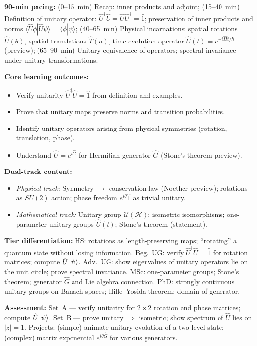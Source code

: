 \documentclass[11pt,a4paper]{article}
\begin{document}
\medskip

\begin{tcolorbox}[modulebox, title={Module~I.1 --- Lecture L02: Unitary Operators and Symmetry Transformations}]
\textbf{90-min pacing:} (0--15~min) Recap: inner products and adjoint;
(15--40~min) Definition of unitary operator: $\hat{U}^\dagger\hat{U} = \hat{U}\hat{U}^\dagger = \hat{1}$;
preservation of inner products and norms $\langle\hat{U}\phi|\hat{U}\psi\rangle = \langle\phi|\psi\rangle$;
(40--65~min) Physical incarnations: spatial rotations $\hat{U}(\theta)$, spatial translations $\hat{T}(a)$,
time-evolution operator $\hat{U}(t) = e^{-i\hat{H}t/\hbar}$ (preview);
(65--90~min) Unitary equivalence of operators; spectral invariance under unitary transformations.

\medskip\textbf{Core learning outcomes:}
\begin{itemize}[leftmargin=1.4em,topsep=2pt,itemsep=1pt]
  \item Verify unitarity $\hat{U}^\dagger\hat{U}=\hat{1}$ from definition and examples.
  \item Prove that unitary maps preserve norms and transition probabilities.
  \item Identify unitary operators arising from physical symmetries (rotation, translation, phase).
  \item Understand $\hat{U} = e^{i\hat{G}}$ for Hermitian generator $\hat{G}$ (Stone's theorem preview).
\end{itemize}

\medskip\textbf{Dual-track content:}
\begin{itemize}[leftmargin=1.4em,topsep=2pt,itemsep=1pt]
  \item \textit{Physical track:} Symmetry $\to$ conservation law (Noether preview); rotations as $SU(2)$
    action; phase freedom $e^{i\theta}\hat{1}$ as trivial unitary.
  \item \textit{Mathematical track:} Unitary group $\mathcal{U}(\mathcal{H})$; isometric isomorphisms;
    one-parameter unitary groups $\hat{U}(t)$; Stone's theorem (statement).
\end{itemize}

\medskip\textbf{Tier differentiation:}
HS: rotations as length-preserving maps; ``rotating'' a quantum state without losing information.
Beg.\ UG: verify $\hat{U}^\dagger\hat{U}=\hat{1}$ for rotation matrices; compute $\hat{U}\ket{\psi}$.
Adv.\ UG: show eigenvalues of unitary operators lie on the unit circle; prove spectral invariance.
MSc: one-parameter groups; Stone's theorem; generator $\hat{G}$ and Lie algebra connection.
PhD: strongly continuous unitary groups on Banach spaces; Hille--Yosida theorem; domain of generator.

\medskip\textbf{Assessment:}
Set~A --- verify unitarity for $2\times 2$ rotation and phase matrices; compute $\hat{U}\ket{\psi}$.
Set~B --- prove unitary $\Rightarrow$ isometric; show spectrum of $\hat{U}$ lies on $|z|=1$.
Projects: (simple) animate unitary evolution of a two-level state; (complex) matrix exponential $e^{i\theta\hat{G}}$ for various generators.
\end{tcolorbox}
\end{document}
